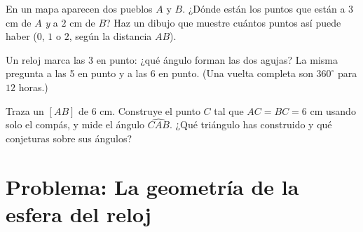 \begin{exercise}[$\star\star$]\label{exo:g6:lines:10}
En un mapa aparecen dos pueblos $A$ y $B$. ¿Dónde están los puntos que
están a $3$ cm de $A$ \emph{y} a $2$ cm de $B$? Haz un dibujo
que muestre cuántos puntos así puede haber ($0$, $1$ o $2$, según
la distancia $AB$).
\end{exercise}

\begin{exercise}[$\star\star$]\label{exo:g6:lines:11}
Un reloj marca las 3 en punto: ¿qué ángulo forman las dos agujas? La misma
pregunta a las 5 en punto y a las 6 en punto. (Una vuelta completa son $360^\circ$
para $12$ horas.)
\end{exercise}

\begin{exercise}[$\star\star\star$]\label{exo:g6:lines:12}
Traza un  $[AB]$ de $6$ cm. Construye el punto $C$ tal que
$AC = BC = 6$ cm usando solo el compás, y mide el ángulo
$\widehat{CAB}$. ¿Qué triángulo has construido y qué
conjeturas sobre sus ángulos?
\end{exercise}

\section{Problema: La geometría de la esfera del reloj}

